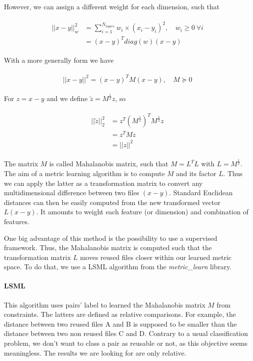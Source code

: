 \documentclass[a4paper]{article}
\begin{document}
	However, we can assign a different weight for each dimension, such that
	
	\begin{align}
	\begin{split}
	||x - y||^2_w &= \sum_{i=1}^{N_{topics}}w_i\times(x_i - y_i)^2, \quad w_i \geq 0 \: \forall i\\
			 	  &= (x - y)^Tdiag(w)(x - y)
	\end{split}
	\end{align}
	
	With a more generally form we have
	
	\begin{align}
	\begin{split}
	||x - y||^2 = (x - y)^TM(x - y), \quad M \succeq 0
	\end{split}
	\end{align}
	
	For $z = x - y$ and we define $\tilde{z} = M^{\frac{1}{2}}z$, so
	
	\begin{align}
	\begin{split}
	||\tilde{z}||^2_2 &= z^T(M^{\frac{1}{2}})^TM^{\frac{1}{2}}z\\
					  &= z^TMz\\
					  &= ||z||^2
	\end{split}
	\end{align}
	
	The matrix $M$ is called Mahalanobis matrix, such that $M = L^TL$ with $L = M^{\frac{1}{2}}$. The aim of a metric learning algorithm is to compute $M$ and its factor $L$. Thus we can apply the latter as a transformation matrix to convert any multidimensional difference between two files $(x - y)$. Standard Euclidean distances can then be easily computed from the new transformed vector $L(x - y)$. It amounts to weight each feature (or dimension) and combination of features.
	
	One big advantage of this method is the possibility to use a supervised framework. Thus, the Mahalanobis matrix is computed such that the transformation matrix $L$ moves reused files closer within our learned metric space. To do that, we use a \ac{LSML} algorithm from the \emph{metric\_learn} library.
	
	\paragraph{\acf{LSML}}

	This algorithm uses pairs' label to learned the Mahalanobis matrix $M$ from constraints. The latters are defined as relative comparisons. For example, the distance between two reused files A and B is supposed to be smaller than the distance between two non reused files C and D. Contrary to a usual classification problem, we don't want to class a pair as reusable or not, as this objective seems meaningless. The results we are looking for are only relative.
	
\end{document}
